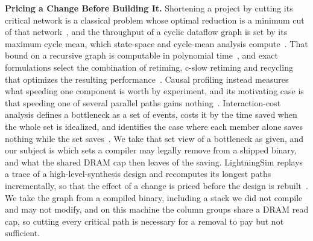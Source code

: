 \textbf{Pricing a Change Before Building It.}
Shortening a project by cutting its critical network is a classical problem whose optimal reduction is a minimum cut of that network~\citep{kelley1961critical,fulkerson1961network}, and the throughput of a cyclic dataflow graph is set by its maximum cycle mean, which state-space and cycle-mean analysis compute~\citep{ghamarian2006throughput,stuijk2008throughput}.
That bound on a recursive graph is computable in polynomial time~\citep{gerez1992iteration}, and exact formulations select the combination of retiming, c-slow retiming and recycling that optimizes the resulting performance~\citep{bufistov2007general,bufistov2009retiming}.
Causal profiling instead measures what speeding one component is worth by experiment, and its motivating case is that speeding one of several parallel paths gains nothing~\citep{curtsinger2015coz}.
Interaction-cost analysis defines a bottleneck as a set of events, costs it by the time saved when the whole set is idealized, and identifies the case where each member alone saves nothing while the set saves~\citep{fields2003interaction}.
We take that set view of a bottleneck as given, and our subject is which sets a compiler may legally remove from a shipped binary, and what the shared DRAM cap then leaves of the saving.
LightningSim replays a trace of a high-level-synthesis design and recomputes its longest paths incrementally, so that the effect of a change is priced before the design is rebuilt~\citep{sarkar2023lightningsim,sarkar2024lightningsim2}.
We take the graph from a compiled binary, including a stack we did not compile and may not modify, and on this machine the column groups share a DRAM read cap, so cutting every critical path is necessary for a removal to pay but not sufficient.


